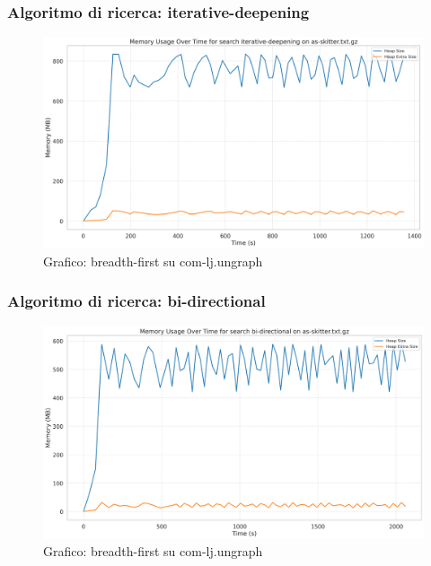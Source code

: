 \documentclass{article}
\begin{document}
\subsubsection{Algoritmo di ricerca: iterative-deepening}
\begin{figure}[h]\centering
\includegraphics[width=\textwidth]{../plots/as-skitter_iterative-deepening.png}
\caption{Grafico: breadth-first su com-lj.ungraph}
\end{figure}
\subsubsection{Algoritmo di ricerca: bi-directional}
\begin{figure}[h]\centering
\includegraphics[width=\textwidth]{../plots/as-skitter_bi-directional.png}
\caption{Grafico: breadth-first su com-lj.ungraph}
\end{figure}
\end{document}
